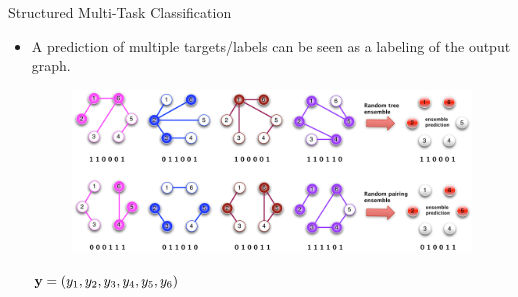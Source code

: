 \documentclass[first=dgreen,second=purple,logo=yellowexc]{aaltoslides}
\newcommand{\yb}{{\bf y}}
\begin{document}
\begin{frame}[allowframebreaks]{Structured Multi-Task Classification}
\begin{itemize}
\begin{itemize}
    \end{itemize}
    \item A prediction of multiple targets/labels can be seen as a labeling of the output graph.
    \begin{figure}
        \includegraphics[scale=.3]{./plots/graphlabeling.pdf}
    \end{figure}
        $\yb=(y_1,y_2,y_3,y_4,y_5,y_6)$
\end{itemize}
\end{frame}
\end{document}
